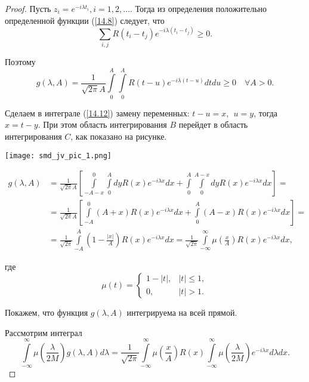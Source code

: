     \begin{proof}
    Пусть $z_i=e^{-i \lambda t_i}, i=1,2, \ldots$. Тогда из определения положительно определенной функции (\ref{14.8}) следует, что
    $$
    \sum_{i, j} R\left(t_i-t_j\right) e^{-i \lambda\left(t_i-t_j\right)} \geq 0 .
    $$
    
    Поэтому
    \begin{equation}
        g(\lambda, A)=\frac{1}{\sqrt{2 \pi} A} \int\limits_0^A \int\limits_0^A R(t-u) e^{-i \lambda(t-u)} d t d u \geq 0 \quad \forall A>0 .
        \label{14.12}
    \end{equation}

    Сделаем в интеграле (\ref{14.12}) замену переменных: $t-u=x,\ \  u=y$, тогда $x=t-y$. При этом область интегрирования $B$ перейдет в область интегрирования $C$, как показано на рисунке.

    \begin{center} 
        \texttt{[image: smd\_jv\_pic\_1.png]}
    \end{center}

    \begin{equation}
        \begin{aligned}
        g(\lambda, A) & = \frac{1}{\sqrt{2 \pi} A}\left[\int\limits_{-A-x}^0 \int\limits_0^A d y R(x) e^{-i \lambda x} d x+\int\limits_0^A \int\limits_0^{A-x} d y R(x) e^{-i \lambda x} d x\right]= \\
        & =\frac{1}{\sqrt{2 \pi} A}\left[\int\limits_{-A}^0(A+x) R(x) e^{-i \lambda x} d x+\int\limits_0^A(A-x) R(x) e^{-i \lambda x} d x\right]= \\
        & =\frac{1}{\sqrt{2 \pi}} \int\limits_{-A}^A\left(1-\frac{|x|}{A}\right) R(x) e^{-i \lambda x} d x=\frac{1}{\sqrt{2 \pi}} \int\limits_{-\infty}^{\infty} \mu\left(\frac{x}{A}\right) R(x) e^{-i \lambda x} d x ,
        \end{aligned}
    \label{14.13}
    \end{equation}
    
    где
    $$
        \mu(t)=\begin{cases}
        1-|t|, &|t| \leq 1, \\
        0,  &  |t|>1 .
        \end{cases}
    $$
    
   Покажем, что функция $g(\lambda, A)$ интегрируема на всей прямой. 
   
   Рассмотрим интеграл
    $$
    \int\limits_{-\infty}^{\infty} \mu\left(\frac{\lambda}{2 M}\right) g(\lambda, A) d \lambda
    =\frac{1}{\sqrt{2 \pi}} \int\limits_{-\infty}^{\infty} \mu\left(\frac{x}{A}\right) R(x) \int\limits_{-\infty}^{\infty} \mu\left(\frac{\lambda}{2 M}\right) e^{-i \lambda x} d \lambda d x .
    $$
    

\end{proof}

